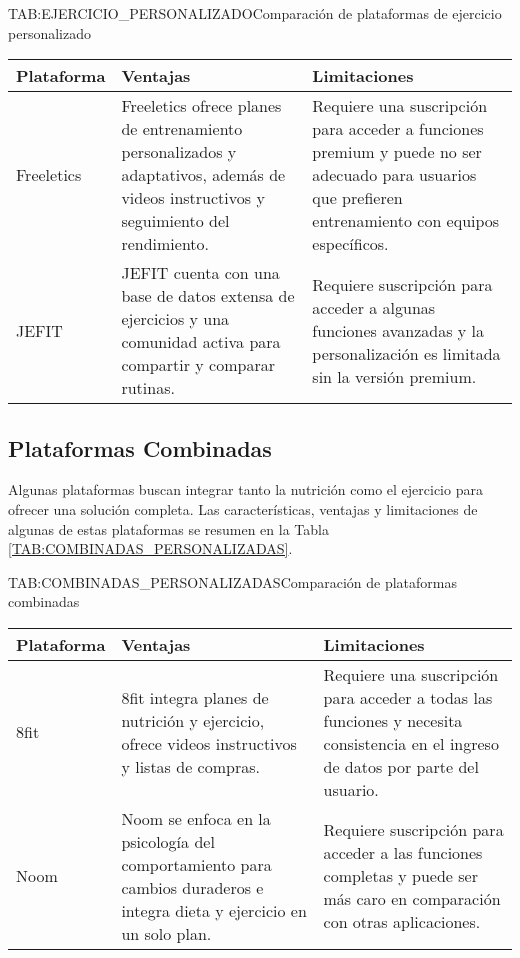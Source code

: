 \begin{table}[Plataformas de Ejercicio Personalizado]{TAB:EJERCICIO_PERSONALIZADO}{Comparación de plataformas de ejercicio personalizado}
  \begin{tabular}{|p{3cm}|p{5cm}|p{5cm}|}
    \hline
    \textbf{Plataforma} & \textbf{Ventajas} & \textbf{Limitaciones} \\
    \hline
    Freeletics & Freeletics ofrece planes de entrenamiento personalizados y adaptativos, además de videos instructivos y seguimiento del rendimiento. & Requiere una suscripción para acceder a funciones premium y puede no ser adecuado para usuarios que prefieren entrenamiento con equipos específicos. \\
    \hline
    JEFIT & JEFIT cuenta con una base de datos extensa de ejercicios y una comunidad activa para compartir y comparar rutinas. & Requiere suscripción para acceder a algunas funciones avanzadas y la personalización es limitada sin la versión premium. \\
    \hline
  \end{tabular}
\end{table}

\subsection{Plataformas Combinadas}

Algunas plataformas buscan integrar tanto la nutrición como el ejercicio para ofrecer una solución completa. Las características, ventajas y limitaciones de algunas de estas plataformas se resumen en la Tabla \ref{TAB:COMBINADAS_PERSONALIZADAS}.

\begin{table}[Plataformas Combinadas]{TAB:COMBINADAS_PERSONALIZADAS}{Comparación de plataformas combinadas}
  \begin{tabular}{|p{3cm}|p{5cm}|p{5cm}|}
    \hline
    \textbf{Plataforma} & \textbf{Ventajas} & \textbf{Limitaciones} \\
    \hline
    8fit & 8fit integra planes de nutrición y ejercicio, ofrece videos instructivos y listas de compras. & Requiere una suscripción para acceder a todas las funciones y necesita consistencia en el ingreso de datos por parte del usuario. \\
    \hline
    Noom & Noom se enfoca en la psicología del comportamiento para cambios duraderos e integra dieta y ejercicio en un solo plan. & Requiere suscripción para acceder a las funciones completas y puede ser más caro en comparación con otras aplicaciones. \\
    \hline
  \end{tabular}
\end{table}

